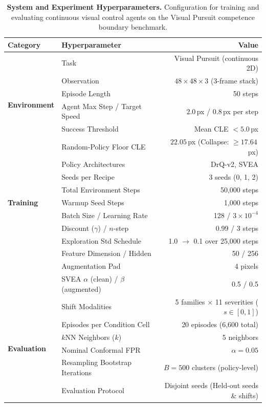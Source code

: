 \begin{table}[t]
\centering
\small
\caption{\textbf{System and Experiment Hyperparameters.} Configuration for training and evaluating continuous visual control agents on the Visual Pursuit competence boundary benchmark.}
\label{tab:hyperparams}
\begin{tabular}{llr}
\toprule
\textbf{Category} & \textbf{Hyperparameter} & \textbf{Value} \\
\midrule
\multirow{6}{*}{\textbf{Environment}} 
 & Task & Visual Pursuit (continuous 2D) \\
 & Observation & $48 \times 48 \times 3$ (3-frame stack) \\
 & Episode Length & 50 steps \\
 & Agent Max Step / Target Speed & $2.0$\,px / $0.8$\,px per step \\
 & Success Threshold & Mean CLE $< 5.0$\,px \\
 & Random-Policy Floor CLE & $22.05$\,px (Collapse: $\ge 17.64$\,px) \\
\midrule
\multirow{7}{*}{\textbf{Training}} 
 & Policy Architectures & DrQ-v2, SVEA \\
 & Seeds per Recipe & 3 seeds (0, 1, 2) \\
 & Total Environment Steps & 50,000 steps \\
 & Warmup Seed Steps & 1,000 steps \\
 & Batch Size / Learning Rate & 128 / $3 \times 10^{-4}$ \\
 & Discount ($\gamma$) / $n$-step & 0.99 / 3 steps \\
 & Exploration Std Schedule & 1.0 $\to$ 0.1 over 25,000 steps \\
 & Feature Dimension / Hidden & 50 / 256 \\
 & Augmentation Pad & 4 pixels \\
 & SVEA $\alpha$ (clean) / $\beta$ (augmented) & 0.5 / 0.5 \\
\midrule
\multirow{6}{*}{\textbf{Evaluation}} 
 & Shift Modalities & 5 families $\times$ 11 severities ($s \in [0, 1]$) \\
 & Episodes per Condition Cell & 20 episodes (6,600 total) \\
 & $k$NN Neighbors ($k$) & 5 neighbors \\
 & Nominal Conformal FPR & $\alpha = 0.05$ \\
 & Resampling Bootstrap Iterations & $B = 500$ clusters (policy-level) \\
 & Evaluation Protocol & Disjoint seeds (Held-out seeds \& shifts) \\
\bottomrule
\end{tabular}
\end{table}
